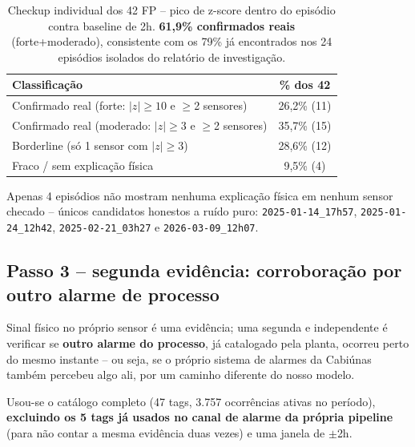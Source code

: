 \documentclass[11pt,a4paper]{article}
\begin{document}
\begin{table}[H]
\centering
\begin{tabular}{lc}
\toprule
\textbf{Classificação} & \textbf{\% dos 42} \\
\midrule
Confirmado real (forte: $|z|\geq10$ e $\geq$2 sensores) & 26,2\% (11) \\
Confirmado real (moderado: $|z|\geq3$ e $\geq$2 sensores) & 35,7\% (15) \\
Borderline (só 1 sensor com $|z|\geq3$) & 28,6\% (12) \\
Fraco / sem explicação física & 9,5\% (4) \\
\bottomrule
\end{tabular}
\caption{Checkup individual dos 42 FP -- pico de z-score dentro do
episódio contra baseline de 2h. \textbf{61,9\% confirmados reais}
(forte+moderado), consistente com os 79\% já encontrados nos 24
episódios isolados do relatório de investigação.}
\end{table}

Apenas 4 episódios não mostram nenhuma explicação física em nenhum
sensor checado -- únicos candidatos honestos a ruído puro:
\texttt{2025-01-14\_17h57}, \texttt{2025-01-24\_12h42},
\texttt{2025-02-21\_03h27} e \texttt{2026-03-09\_12h07}.


\noindent{}

\subsection{Passo 3 -- segunda evidência: corroboração por outro alarme de processo}

Sinal físico no próprio sensor é uma evidência; uma segunda e
independente é verificar se \textbf{outro alarme do processo}, já
catalogado pela planta, ocorreu perto do mesmo instante -- ou seja,
se o próprio sistema de alarmes da Cabiúnas também percebeu algo ali,
por um caminho diferente do nosso modelo.

Usou-se o catálogo completo (47 tags, 3.757 ocorrências ativas no
período), \textbf{excluindo os 5 tags já usados no canal de alarme
da própria pipeline} (para não contar a mesma evidência duas vezes) e
uma janela de $\pm$2h.
\end{document}
